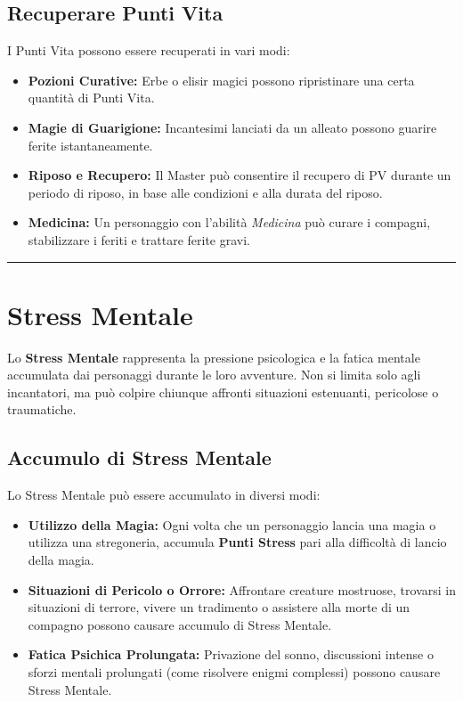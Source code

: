 \documentclass[../manuale_main.tex]{subfiles}
\begin{document}
\vspace{0.3cm}

\subsection{Recuperare Punti Vita}
I Punti Vita possono essere recuperati in vari modi:
\begin{itemize}
    \item \textbf{Pozioni Curative:} Erbe o elisir magici possono ripristinare una certa quantità di Punti Vita.
    \item \textbf{Magie di Guarigione:} Incantesimi lanciati da un alleato possono guarire ferite istantaneamente.
    \item \textbf{Riposo e Recupero:} Il Master può consentire il recupero di PV durante un periodo di riposo, in base alle condizioni e alla durata del riposo.
    \item \textbf{Medicina:} Un personaggio con l'abilità \textit{Medicina} può curare i compagni, stabilizzare i feriti e trattare ferite gravi.
\end{itemize}

\vspace{0.5cm}
\noindent
\begin{center}
\rule{\textwidth}{0.4pt} 
\end{center}
\vspace{0.5cm}

\section{Stress Mentale}

Lo \textbf{Stress Mentale} rappresenta la pressione psicologica e la fatica mentale accumulata dai personaggi durante le loro avventure. Non si limita solo agli incantatori, ma può colpire chiunque affronti situazioni estenuanti, pericolose o traumatiche.  

\subsection{Accumulo di Stress Mentale}
Lo Stress Mentale può essere accumulato in diversi modi:
\begin{itemize}
    \item \textbf{Utilizzo della Magia:} Ogni volta che un personaggio lancia una magia o utilizza una stregoneria, accumula \textbf{Punti Stress} pari alla difficoltà di lancio della magia. 
    
    \item \textbf{Situazioni di Pericolo o Orrore:} Affrontare creature mostruose, trovarsi in situazioni di terrore, vivere un tradimento o assistere alla morte di un compagno possono causare accumulo di Stress Mentale.
    
    \item \textbf{Fatica Psichica Prolungata:} Privazione del sonno, discussioni intense o sforzi mentali prolungati (come risolvere enigmi complessi) possono causare Stress Mentale.
\end{itemize}
\end{document}
